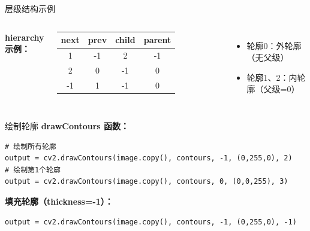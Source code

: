 \begin{frame}{层级结构示例}
    \begin{columns}
        \centering

        \textbf{hierarchy 示例：}
        \begin{table}
            \centering
            \tiny
            \begin{tabular}{cccc}
                \toprule
                next & prev & child & parent \\
                \midrule
                1 & -1 & 2 & -1 \\
                2 & 0 & -1 & 0 \\
                -1 & 1 & -1 & 0 \\
                \bottomrule
            \end{tabular}
        \end{table}

        \begin{itemize}\small\itemsep=0pt
            \item 轮廓0：外轮廓（无父级）
            \item 轮廓1、2：内轮廓（父级=0）
        \end{itemize}
    \end{columns}
\end{frame}

\begin{frame}[fragile]{绘制轮廓}
    \textbf{drawContours 函数：}
    \begin{lstlisting}[basicstyle=\ttfamily\small]
# 绘制所有轮廓
output = cv2.drawContours(image.copy(), contours, -1, (0,255,0), 2)
# 绘制第1个轮廓
output = cv2.drawContours(image.copy(), contours, 0, (0,0,255), 3)
    \end{lstlisting}

    \textbf{填充轮廓（thickness=-1）：}
    \begin{lstlisting}[basicstyle=\ttfamily\small]
output = cv2.drawContours(image.copy(), contours, -1, (0,255,0), -1)
    \end{lstlisting}

\end{frame}

